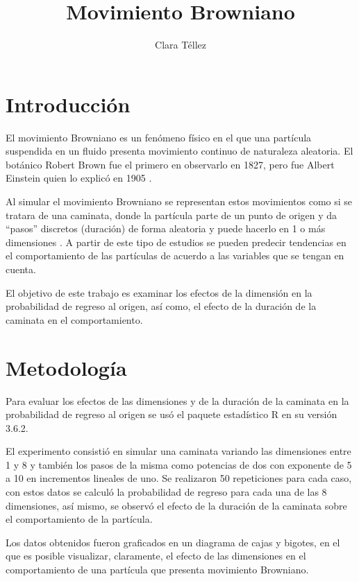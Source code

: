 ﻿\documentclass{article}
\begin{document}
\title{\textbf{Movimiento Browniano}}
\author{Clara T\'ellez}
\maketitle

\section{Introducci\'on}\label{intro}

El movimiento Browniano es un fen\'omeno f\'isico en el que una
part\'icula suspendida en un fluido presenta movimiento continuo de
naturaleza aleatoria.  El bot\'anico Robert Brown fue el primero en
observarlo en 1827, pero fue Albert Einstein quien lo explic\'o en
1905 \cite{Baz}.

Al simular el movimiento Browniano se representan estos movimientos
como si se tratara de una caminata, donde la part\'icula parte de un
punto de origen y da ``pasos'' discretos (duraci\'on) de forma
aleatoria y puede hacerlo en 1 o m\'as dimensiones \cite{Eli}.  A
partir de este tipo de estudios se pueden predecir tendencias en el
comportamiento de las part\'iculas de acuerdo a las variables que se
tengan en cuenta.

El objetivo de este trabajo es examinar los efectos de la dimensi\'on
en la probabilidad de regreso al origen, as\'i como, el efecto de la
duraci\'on de la caminata en el comportamiento.

\section{Metodolog\'ia}\label{met}

Para evaluar los efectos de las dimensiones y de la duraci\'on de la
caminata en la probabilidad de regreso al origen se us\'o el paquete
estad\'istico R en su versi\'on 3.6.2.

El experimento consisti\'o en simular una caminata variando las
dimensiones entre 1 y 8 y tambi\'en los pasos de la misma como
potencias de dos con exponente de 5 a 10 en incrementos lineales de
uno.  Se realizaron 50 repeticiones para cada caso, con estos datos se
calcul\'o la probabilidad de regreso para cada una de las 8
dimensiones, as\'i mismo, se observ\'o el efecto de la duraci\'on de
la caminata sobre el comportamiento de la part\'icula.

Los datos obtenidos fueron graficados en un diagrama de cajas y
bigotes, en el que es posible visualizar, claramente, el efecto de las
dimensiones en el comportamiento de una part\'icula que presenta
movimiento Browniano.
\end{document}
